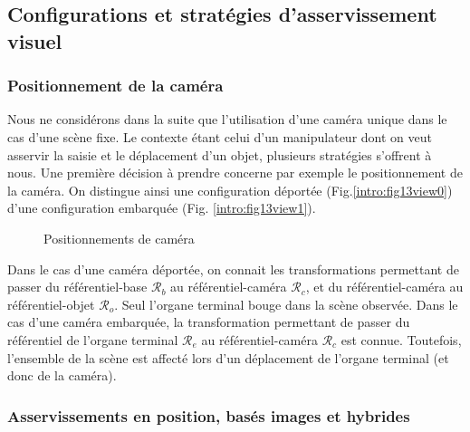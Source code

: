 \subsection{Configurations et stratégies d'asservissement visuel}

\subsubsection{Positionnement de la caméra}

Nous ne considérons dans la suite que l'utilisation d'une caméra unique dans le cas d'une scène fixe. Le contexte étant celui d'un manipulateur dont on veut asservir la saisie et le déplacement d'un objet, plusieurs stratégies s'offrent à nous. Une première décision à prendre concerne par exemple le positionnement de la caméra. On distingue ainsi une configuration déportée (Fig.\ref{intro:fig13view0}) d'une configuration embarquée (Fig. \ref{intro:fig13view1}).

\begin{figure}[htp]
  \centering
   \hfill
    \caption{\footnotesize{Positionnements de caméra}}
\label{intro:fig13}
\end{figure}

Dans le cas d'une caméra déportée, on connait les transformations permettant de passer du référentiel-base $\mathcal R_b$ au référentiel-caméra $\mathcal R_c$, et du référentiel-caméra au référentiel-objet $\mathcal R_o$. Seul l'organe terminal bouge dans la scène observée. Dans le cas d'une caméra embarquée, la transformation permettant de passer du référentiel de l'organe terminal $\mathcal R_e$ au référentiel-caméra $\mathcal R_c$ est connue. Toutefois, l'ensemble de la scène est affecté lors d'un déplacement de l'organe terminal (et donc de la caméra).

\subsubsection{Asservissements en position, basés images et hybrides}

